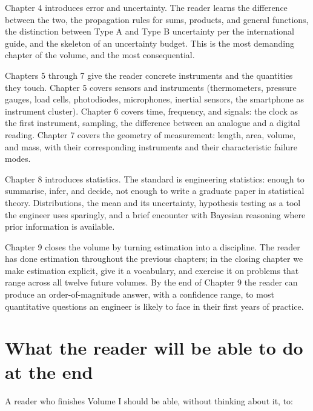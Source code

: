 Chapter 4 introduces error and uncertainty. The reader learns the
difference between the two, the propagation rules for sums,
products, and general functions, the distinction between Type A and
Type B uncertainty per the international guide, and the skeleton of
an uncertainty budget. This is the most demanding chapter of the
volume, and the most consequential.

Chapters 5 through 7 give the reader concrete instruments and the
quantities they touch. Chapter 5 covers sensors and instruments
(thermometers, pressure gauges, load cells, photodiodes, microphones,
inertial sensors, the smartphone as instrument cluster). Chapter 6
covers time, frequency, and signals: the clock as the first
instrument, sampling, the difference between an analogue and a
digital reading. Chapter 7 covers the geometry of measurement:
length, area, volume, and mass, with their corresponding instruments
and their characteristic failure modes.

Chapter 8 introduces statistics. The standard is engineering
statistics: enough to summarise, infer, and decide, not enough to
write a graduate paper in statistical theory. Distributions, the
mean and its uncertainty, hypothesis testing as a tool the engineer
uses sparingly, and a brief encounter with Bayesian reasoning where
prior information is available.

Chapter 9 closes the volume by turning estimation into a discipline.
The reader has done estimation throughout the previous chapters; in
the closing chapter we make estimation explicit, give it a vocabulary,
and exercise it on problems that range across all twelve future
volumes. By the end of Chapter 9 the reader can produce an
order-of-magnitude answer, with a confidence range, to most
quantitative questions an engineer is likely to face in their first
years of practice.

\section*{What the reader will be able to do at the end}

A reader who finishes Volume I should be able, without thinking
about it, to:

